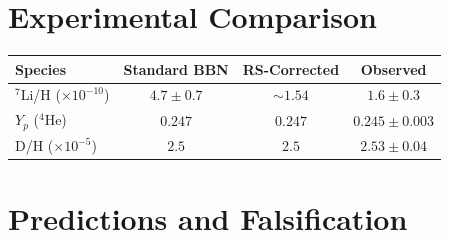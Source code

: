 \documentclass[12pt,a4paper]{article}
\theoremstyle{definition}
\theoremstyle{remark}
\begin{document}
\section{Experimental Comparison}
\label{sec:compare}

\begin{center}
\renewcommand{\arraystretch}{1.3}
\begin{tabular}{@{}lccc@{}}
\toprule
\textbf{Species} & \textbf{Standard BBN} & \textbf{RS-Corrected} &
\textbf{Observed} \\
\midrule
$^7$Li/H ($\times 10^{-10}$) & $4.7 \pm 0.7$ & $\sim 1.54$ &
$1.6 \pm 0.3$ \\
$Y_p$ ($^4$He) & $0.247$ & $0.247$ & $0.245 \pm 0.003$ \\
D/H ($\times 10^{-5}$) & $2.5$ & $2.5$ & $2.53 \pm 0.04$ \\
\bottomrule
\end{tabular}
\end{center}

\section{Predictions and Falsification}
\label{sec:predict}
\end{document}
